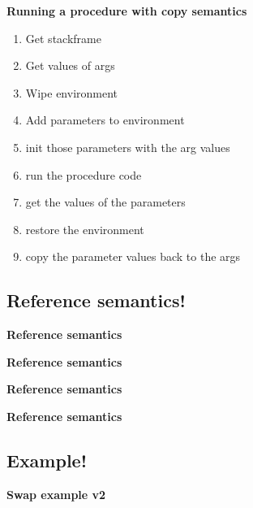 \begin{frame}{\textbf{Running a procedure with copy semantics}}
    
    \begin{enumerate}[<+->]
        \item Get stackframe
        \item Get values of args
        \item Wipe environment
        \item Add parameters to environment
        \item init those parameters with the arg values
        \item run the procedure code
        \item get the values of the parameters
        \item restore the environment
        \item copy the parameter values back to the args
    \end{enumerate}
\end{frame}


\subsection*{Reference semantics!}
\begin{frame}\textbf{{Reference semantics}}
    
\end{frame}
\begin{frame}\textbf{{Reference semantics}}
    
\end{frame}
\begin{frame}\textbf{{Reference semantics}}
    
\end{frame}
\begin{frame}\textbf{{Reference semantics}}
    
\end{frame}

\subsection*{Example!}
\begin{frame}{\textbf{Swap example v2}}
    
\end{frame}

